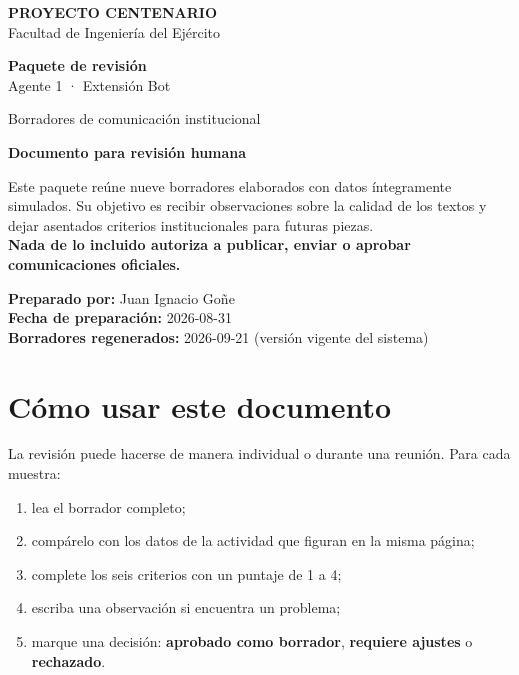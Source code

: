 \documentclass[11pt,a4paper]{article}
\begin{document}
\begin{Form}

\begin{titlepage}
\centering
\vspace*{1.4cm}
{\Large\color{azul}\textbf{PROYECTO CENTENARIO}}\\[0.4cm]
{\large Facultad de Ingeniería del Ejército}\par
\vspace{1.8cm}
{\Huge\color{azul}\textbf{Paquete de revisión}}\\[0.35cm]
{\LARGE Agente 1 · Extensión Bot}\par
\vspace{1cm}
{\Large Borradores de comunicación institucional}\par
\vfill
\begin{tcolorbox}[colback=verde,colframe=azul,width=0.9\textwidth]
\textbf{Documento para revisión humana}\par
Este paquete reúne nueve borradores elaborados con datos íntegramente simulados. Su objetivo es recibir observaciones sobre la calidad de los textos y dejar asentados criterios institucionales para futuras piezas.\\[0.2cm]
\textbf{Nada de lo incluido autoriza a publicar, enviar o aprobar comunicaciones oficiales.}
\end{tcolorbox}
\vfill
\textbf{Preparado por:} Juan Ignacio Goñe\\
\textbf{Fecha de preparación:} 2026-08-31\\
\textbf{Borradores regenerados:} 2026-09-21 (versión vigente del sistema)
\end{titlepage}

\tableofcontents
\clearpage

\section{Cómo usar este documento}

La revisión puede hacerse de manera individual o durante una reunión. Para cada muestra:

\begin{enumerate}
  \item lea el borrador completo;
  \item compárelo con los datos de la actividad que figuran en la misma página;
  \item complete los seis criterios con un puntaje de 1 a 4;
  \item escriba una observación si encuentra un problema;
  \item marque una decisión: \textbf{aprobado como borrador}, \textbf{requiere ajustes} o \textbf{rechazado}.
\end{enumerate}


\end{Form}
\end{document}

